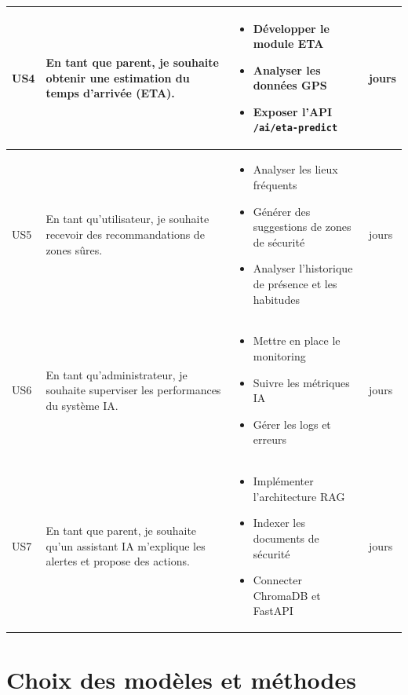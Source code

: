 \begin{longtable}{|>{\centering\arraybackslash}p{}|>{\raggedright\arraybackslash}p{}|>{\raggedright\arraybackslash}p{}|>{\centering\arraybackslash}p{}|}
US4 & En tant que parent, je souhaite obtenir une estimation du temps d’arrivée (ETA).
& \begin{itemize}[leftmargin=*, nosep]
    \item Développer le module ETA
    \item Analyser les données GPS
    \item Exposer l’API \texttt{/ai/eta-predict}
\end{itemize} & 4 jours \\ \hline

US5 & En tant qu’utilisateur, je souhaite recevoir des recommandations de zones sûres.
& \begin{itemize}[leftmargin=*, nosep]
    \item Analyser les lieux fréquents
    \item Générer des suggestions de zones de sécurité
    \item Analyser l’historique de présence et les habitudes
\end{itemize} & 4 jours \\ \hline

US6 & En tant qu’administrateur, je souhaite superviser les performances du système IA.
& \begin{itemize}[leftmargin=*, nosep]
    \item Mettre en place le monitoring
    \item Suivre les métriques IA
    \item Gérer les logs et erreurs
\end{itemize} & 3 jours \\ \hline

US7 & En tant que parent, je souhaite qu’un assistant IA m’explique les alertes et propose des actions.
& \begin{itemize}[leftmargin=*, nosep]
    \item Implémenter l’architecture RAG
    \item Indexer les documents de sécurité
    \item Connecter ChromaDB et FastAPI
\end{itemize} & 6 jours \\ \hline

\end{longtable}

\section{Choix des modèles et méthodes}


